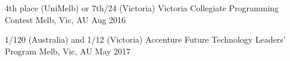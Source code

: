 




\begin{cvhonors}


\cvhonor
{4th place (UniMelb) or 7th/24 (Victoria)} %
{Victoria Collegiate Programming Contest} %
{Melb, Vic, AU} %
{Aug 2016} %


\cvhonor
{1/120 (Australia) and 1/12 (Victoria)} %
{Accenture Future Technology Leaders’ Program} %
{Melb, Vic, AU} %
{May 2017} %

\end{cvhonors}